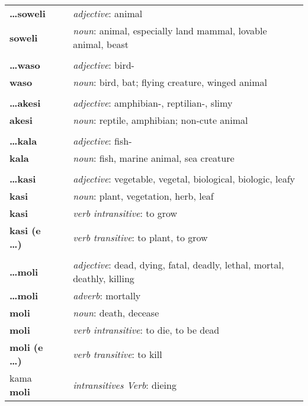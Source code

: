 \begin{supertabular}{p{2,5cm}|ll}
\textbf{\dots soweli} && \textit{adjective}: animal \\ %
\textbf{soweli} && \textit{noun}: animal, especially land mammal, lovable animal, beast \\ %
 && \\ %
\textbf{\dots waso} && \textit{adjective}: bird- \\ %
\textbf{waso} && \textit{noun}: bird, bat; flying creature, winged animal \\ %
 && \\ %
\textbf{\dots akesi} && \textit{adjective}: amphibian-, reptilian-, slimy \\ %
\textbf{akesi} && \textit{noun}: reptile, amphibian; non-cute animal \\ %
 && \\ %
\textbf{\dots kala} && \textit{adjective}: fish- \\ %
\textbf{kala} && \textit{noun}: fish, marine animal, sea creature \\ %
 && \\ %
\textbf{\dots kasi} && \textit{adjective}: vegetable, vegetal, biological, biologic, leafy \\ %
\textbf{kasi} && \textit{noun}: plant, vegetation, herb, leaf \\ %
\textbf{kasi} && \textit{verb intransitive}: to grow \\ %
\textbf{kasi (e \dots)} && \textit{verb transitive}: to plant, to grow \\ %
 && \\ %
\textbf{\dots moli} && \textit{adjective}: dead, dying, fatal, deadly, lethal, mortal, deathly, killing \\ %
\textbf{\dots moli} && \textit{adverb}: mortally \\ %
\textbf{moli} && \textit{noun}: death, decease \\ %
\textbf{moli} && \textit{verb intransitive}: to die, to be dead \\ %
\textbf{moli (e \dots)} && \textit{verb transitive}: to kill \\ %
kama \textbf{moli} && \textit{intransitives Verb}: dieing \\ %

\end{supertabular}
